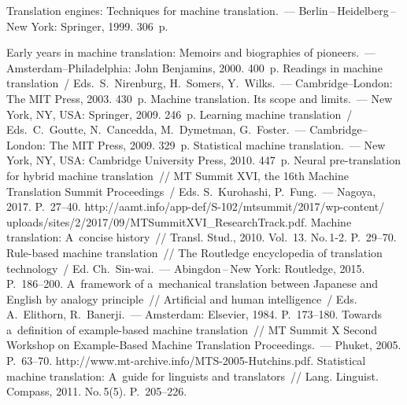  \begin{multicols}{2}

\renewcommand{\bibname}{\protect\rmfamily Литература}

{\small\frenchspacing
{%
\begin{thebibliography}{99}


 Translation engines: Techniques for machine translation.~--- 
Berlin\,--\,Heidelberg\,--\,New York: Springer, 1999. 306~p.

 Early years in machine translation: Memoirs and 
biographies of pioneers.~--- Amsterdam--Philadelphia: John Benjamins, 2000. 
400~p.
Readings in machine translation~/ Eds.\ S.~Nirenburg, H.~Somers,  
Y.~Wilks.~--- Cambridge--London: The MIT Press, 2003. 430~p.
 Machine translation. Its scope and limits.~--- New York, NY, 
USA: Springer, 2009. 246~p.
Learning machine translation~/ Eds.\ C.~Goutte, N.~Cancedda, M.~Dymetman, 
G.~Foster.~--- Cambridge--London: The MIT Press, 2009. 329~p.
 Statistical machine translation.~--- New York, NY, USA: 
Cambridge University Press, 2010. 447~p.
 Neural pre-translation for hybrid machine translation~// 
MT Summit XVI, the 16th Machine Translation Summit Proceedings~/ Eds. 
S.~Ku\-ro\-ha\-shi, P.~Fung.~--- Nagoya, 2017. P.~27--40. {\sf  
http://aamt.\linebreak  info/app-def/S-102/mtsummit/2017/wp-content/\linebreak
 uploads/sites/2/2017/09/MTSummitXVI\_\linebreak ResearchTrack.pdf}.
 Machine translation: A~concise history~// Transl. 
Stud., 2010. 
Vol.~13. No.\,1-2. P.~29--70.
 Rule-based machine translation~// The Routledge 
encyclopedia of translation technology~/ Ed. Ch.~Sin-wai.~--- Abingdon\,--\,New 
York: Routledge, 2015. P.~186--200.
 A~framework of a~mechanical translation between Japanese 
and English by analogy principle~// Artificial and human intelligence~/ Eds.  
A.~Elithorn, R.~Banerji.~--- Amsterdam: Elsevier, 1984. P.~173--180.
 Towards a~definition of example-based machine 
translation~// MT Summit X Second Workshop on Example-Based Machine 
Translation Proceedings.~--- Phuket, 2005. P.~63--70. {\sf  
http://www.mt-archive.info/MTS-2005-Hutchins.pdf}.
 Statistical machine translation: A~guide for linguists 
and translators~// Lang. Linguist. Compass, 2011. No.\,5(5). P.~205--226.


\end{thebibliography}}}
\end{multicols}

